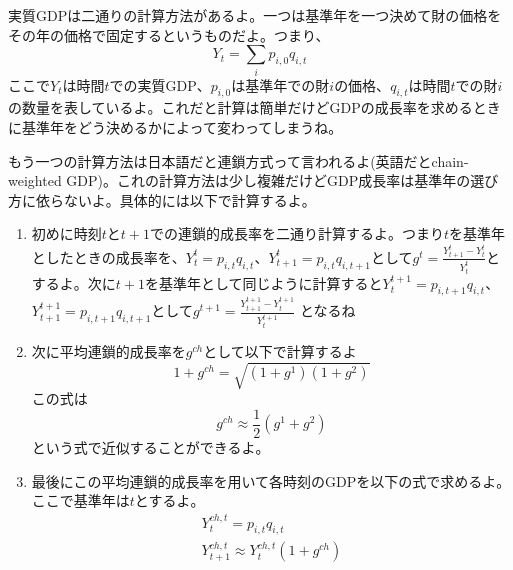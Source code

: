 \documentclass[dvipdfmx,a4paper, 12pt]{article}
\begin{document}
\begin{Introduction}
実質GDPは二通りの計算方法があるよ。一つは基準年を一つ決めて財の価格をその年の価格で固定するというものだよ。つまり、
\begin{equation*}
  Y_t=\sum_i p_{i,0}q_{i,t}
\end{equation*}
ここで$Y_t$は時間$t$での実質GDP、$p_{i,0}$は基準年での財$i$の価格、$q_{i,t}$は時間$t$での財$i$の数量を表しているよ。これだと計算は簡単だけどGDPの成長率を求めるときに基準年をどう決めるかによって変わってしまうね。

もう一つの計算方法は日本語だと連鎖方式って言われるよ(英語だとchain-weighted GDP)。これの計算方法は少し複雑だけどGDP成長率は基準年の選び方に依らないよ。具体的には以下で計算するよ。
\begin{enumerate}
  \item 初めに時刻$t$と$t+1$での連鎖的成長率を二通り計算するよ。つまり$t$を基準年としたときの成長率を、$Y_t^t=p_{i,t}q_{i,t}$、$Y_{t+1}^t=p_{i,t}q_{i,t+1}$として$\displaystyle g^t=\frac{Y_{t+1}^t-Y_t^t}{Y_t^t}$とするよ。次に$t+1$を基準年として同じように計算すると$Y_t^{t+1}=p_{i,t+1}q_{i,t}$、$Y_{t+1}^{t+1}=p_{i,t+1}q_{i,t+1}$として$\displaystyle g^{t+1}=\frac{Y_{t+1}^{t+1}-Y_t^{t+1}}{Y_t^{t+1}}$
  となるね
  \item 次に平均連鎖的成長率を$g^{ch}$として以下で計算するよ
  \begin{equation*}
    1+g^{ch}=\sqrt{\left(1+g^1\right)\left(1+g^2\right)}
  \end{equation*}
  この式は
  \begin{equation*}
    g^{ch}\approx \frac{1}{2}\left(g^1+g^2\right)
  \end{equation*}
  という式で近似することができるよ。
  \item 最後にこの平均連鎖的成長率を用いて各時刻のGDPを以下の式で求めるよ。ここで基準年は$t$とするよ。
  \begin{displaymath}
    \begin{array}{l}
      Y_t^{ch,t}=p_{i,t}q_{i,t}\\
      Y_{t+1}^{ch,t} \approx Y_t^{ch,t}(1+g^{ch})
    \end{array}
  \end{displaymath}
\end{enumerate}


\end{Introduction}
\end{document}

